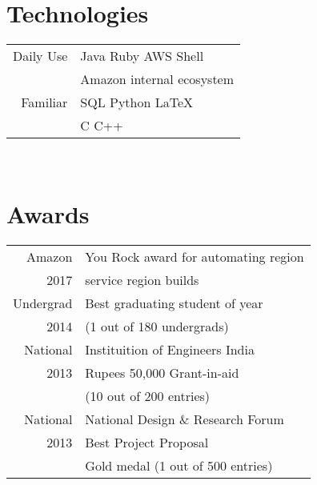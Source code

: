 \documentclass[10pt]{article} %
\begin{document}
{\begin{minipage}[t]{0.4\textwidth}

\section{\textbf{Technologies}}
\begin{tabular}{rl}
Daily Use
& Java \textbullet{} Ruby \textbullet{} AWS \textbullet{} Shell \\ 
& Amazon internal ecosystem\\
Familiar
& SQL \textbullet{} Python \textbullet{} \LaTeX \\
& C \textbullet{} C++\\
\end{tabular}\\


\section{\textbf{Awards}} 
\begin{tabular}{rl}
Amazon & You Rock award for automating region\\
2017 & service region builds\\
Undergrad & Best graduating student of year\\
2014 &  (1 out of 180 undergrads)\\
National & Instituition of Engineers India\\
2013  &  Rupees 50,000 Grant-in-aid\\
         & (10 out of 200 entries)\\
National & National Design \& Research Forum\\
2013     &  Best Project Proposal\\
         & Gold medal (1 out of 500 entries)\\
\end{tabular}\\[10pt]



\end{minipage}}
\end{document}
